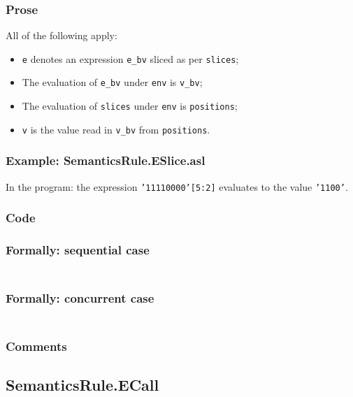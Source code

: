 \documentclass{book}
\begin{document}
  \subsubsection{Prose}
  All of the following apply:
  \begin{itemize}
  \item \texttt{e} denotes an expression \texttt{e\_bv} sliced as per \texttt{slices};
  \item The evaluation of \texttt{e\_bv} under \texttt{env} is \texttt{v\_bv};
  \item The evaluation of \texttt{slices} under \texttt{env} is \texttt{positions};
  \item \texttt{v} is the value read in \texttt{v\_bv} from \texttt{positions}.
  \end{itemize}

  \subsubsection{Example: SemanticsRule.ESlice.asl}
    In the program:
    the expression \texttt{'11110000'[5:2]} evaluates to the value \texttt{'1100'}.

  \subsubsection{Code}

  \subsubsection{Formally: sequential case}
  \begin{align}
  \end{align} 

  \subsubsection{Formally: concurrent case}
  \begin{align}
  \end{align} 

  \subsubsection{Comments}

\subsection{SemanticsRule.ECall \label{sec:SemanticsRule.ECall}}
\end{document}
